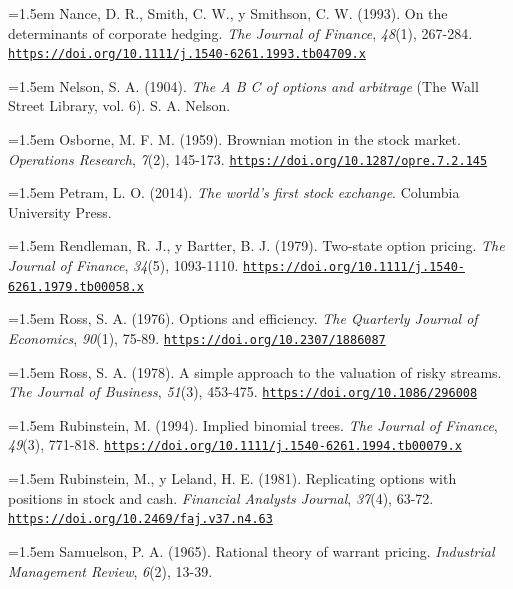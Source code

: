 \documentclass[10pt,a4paper]{article}
\begin{document}
\noindent\hangindent=1.5em Nance, D. R., Smith, C. W., y Smithson, C. W. (1993). On the determinants of corporate hedging. \textit{The Journal of Finance}, \textit{48}(1), 267-284. \href{https://doi.org/10.1111/j.1540-6261.1993.tb04709.x}{\nolinkurl{https://doi.org/10.1111/j.1540-6261.1993.tb04709.x}}

\noindent\hangindent=1.5em Nelson, S. A. (1904). \textit{The A B C of options and arbitrage} (The Wall Street Library, vol. 6). S. A. Nelson.

\noindent\hangindent=1.5em Osborne, M. F. M. (1959). Brownian motion in the stock market. \textit{Operations Research}, \textit{7}(2), 145-173. \href{https://doi.org/10.1287/opre.7.2.145}{\nolinkurl{https://doi.org/10.1287/opre.7.2.145}}

\noindent\hangindent=1.5em Petram, L. O. (2014). \textit{The world's first stock exchange}. Columbia University Press.

\noindent\hangindent=1.5em Rendleman, R. J., y Bartter, B. J. (1979). Two-state option pricing. \textit{The Journal of Finance}, \textit{34}(5), 1093-1110. \href{https://doi.org/10.1111/j.1540-6261.1979.tb00058.x}{\nolinkurl{https://doi.org/10.1111/j.1540-6261.1979.tb00058.x}}

\noindent\hangindent=1.5em Ross, S. A. (1976). Options and efficiency. \textit{The Quarterly Journal of Economics}, \textit{90}(1), 75-89. \href{https://doi.org/10.2307/1886087}{\nolinkurl{https://doi.org/10.2307/1886087}}

\noindent\hangindent=1.5em Ross, S. A. (1978). A simple approach to the valuation of risky streams. \textit{The Journal of Business}, \textit{51}(3), 453-475. \href{https://doi.org/10.1086/296008}{\nolinkurl{https://doi.org/10.1086/296008}}

\noindent\hangindent=1.5em Rubinstein, M. (1994). Implied binomial trees. \textit{The Journal of Finance}, \textit{49}(3), 771-818. \href{https://doi.org/10.1111/j.1540-6261.1994.tb00079.x}{\nolinkurl{https://doi.org/10.1111/j.1540-6261.1994.tb00079.x}}

\noindent\hangindent=1.5em Rubinstein, M., y Leland, H. E. (1981). Replicating options with positions in stock and cash. \textit{Financial Analysts Journal}, \textit{37}(4), 63-72. \href{https://doi.org/10.2469/faj.v37.n4.63}{\nolinkurl{https://doi.org/10.2469/faj.v37.n4.63}}

\noindent\hangindent=1.5em Samuelson, P. A. (1965). Rational theory of warrant pricing. \textit{Industrial Management Review}, \textit{6}(2), 13-39.
\end{document}
